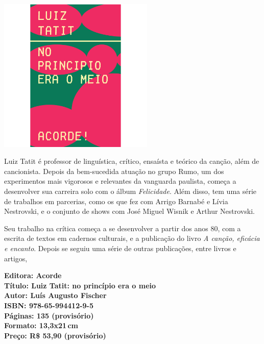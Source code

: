 \pagestyle{acorde}
\label{acorde}

\begin{center}
\hspace*{.5cm}\includegraphics[width=74mm]{./CAPAS/ACORDE_TATIT.jpg}
\end{center}
\hspace*{-7cm}\hrulefill\hspace*{-7cm}
\medskip

\noindent{}Luiz Tatit é professor de linguística, crítico, ensaísta e teórico da canção, além de cancionista. Depois da bem-sucedida atuação no grupo Rumo, um dos experimentos mais vigorosos e relevantes da vanguarda paulista, começa a desenvolver sua carreira solo com o álbum \textit{Felicidade}. Além disso, tem uma série de trabalhos em parcerias, como os que fez com Arrigo Barnabé e Lívia Nestrovski, e o conjunto de shows com José Miguel Wisnik e Arthur Nestrovski.

Seu trabalho na crítica começa a se desenvolver a partir dos anos 80, com a escrita de textos em cadernos culturais, e a publicação do livro \textit{A canção, eficácia e encanto}. Depois se seguiu uma série de outras publicações, entre livros e artigos, 

\vfill
\hspace*{-.4cm}\begin{minipage}[c]{.5\linewidth}
\small\textbf{
\hspace*{-.1cm}Editora: Acorde\\
Título: Luiz Tatit: no princípio era o meio\\
Autor: Luís Augusto Fischer\\ 
ISBN: 978-65-994412-9-5\\
Páginas: 135 (provisório)\\
Formato: 13,3x21\,cm\\
Preço: R\$ 53,90 (provisório)\\
}
\end{minipage}
\pagebreak

